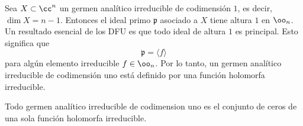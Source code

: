 Sea $X\subset\cc^n$ un germen analítico irreducible de codimensión $1$, es decir, $\dim X=n-1$. Entonces el ideal primo $\mathfrak{p}$ asociado a $X$ tiene altura $1$ en $\oo_n$. Un resultado esencial de los DFU es que todo ideal de altura $1$ es principal. Esto significa que 
\begin{equation*}
	\mathfrak{p}=\langle f \rangle 
\end{equation*}
para algún elemento irreducible $f\in\oo_n$. Por lo tanto, un germen analítico irreducible de codimensión uno está definido por una función holomorfa irreducible.

\begin{propo}\label{hipersuperficiesenCn}
	Todo germen analítico irreducible de codimension uno es el conjunto de ceros de una sola función holomorfa irreducible.
\end{propo}

